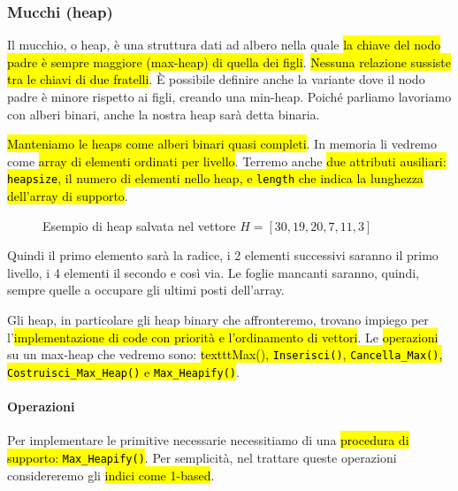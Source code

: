 \documentclass[a4paper,11pt,twoside]{article}
\theoremstyle{plain}
\theoremstyle{definition}
\theoremstyle{remark}
\begin{document}
\subsubsection{Mucchi (heap)}\label{sec:heap}

Il mucchio, o heap, è una struttura dati ad albero nella quale \hl{la chiave del
nodo padre è sempre maggiore (max-heap) di quella dei figli}. \hl{Nessuna relazione
sussiste tra le chiavi di due fratelli}. È possibile definire anche la variante
dove il nodo padre è minore rispetto ai figli, creando una min-heap. Poiché
parliamo lavoriamo con alberi binari, anche la nostra heap sarà detta binaria.

\hl{Manteniamo le heaps come alberi binari quasi completi}. In memoria li
vedremo come \hl{array di elementi ordinati per livello}. Terremo anche \hl{due
attributi ausiliari: \texttt{heapsize}, il numero di elementi nello heap, e
\texttt{length} che indica la lunghezza dell'array di supporto}.

\begin{figure}[htb]
  \centering
  \caption{Esempio di heap salvata nel vettore $H = [ 30, 19, 20, 7, 11, 3 ]$}%
  \label{fig:es-heap}
\end{figure}

Quindi il primo elemento sarà la radice, i 2 elementi successivi saranno il
primo livello, i 4 elementi il secondo e così via. Le foglie mancanti saranno,
quindi, sempre quelle a occupare gli ultimi posti dell'array.

Gli heap, in particolare gli heap binary che affronteremo, trovano impiego per
l'\hl{implementazione di code con priorità e l'ordinamento di vettori}. Le
\hl{operazioni} su un max-heap che vedremo sono: \hl{texttt{Max()},
\texttt{Inserisci()}, \texttt{Cancella\_Max()}, \texttt{Costruisci\_Max\_Heap()}
e \texttt{Max\_Heapify()}}.

\paragraph{Operazioni} Per implementare le primitive necessarie necessitiamo di
una \hl{procedura di supporto: \texttt{Max\_Heapify()}}. Per semplicità, nel trattare
queste operazioni considereremo gli \hl{indici come 1-based}.
\end{document}
